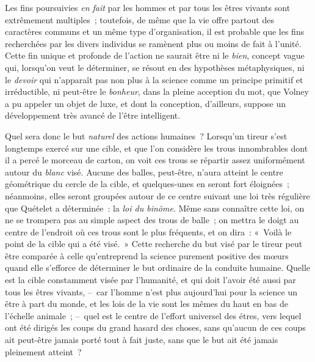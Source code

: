 \documentclass[french,twoside]{book} %
\begin{document}
Les fins poursuivies \emph{en fait} par les hommes et par tous les êtres vivants sont extrêmement multiples ; toutefois, de même que la vie offre partout des caractères communs et un même type d’organisation, il est probable que les fins recherchées par les divers individus se ramènent plus ou moins de fait à l’unité. Cette fin unique et profonde de l’action ne saurait être ni le \emph{bien}, concept vague qui, lorsqu’on veut le déterminer, se résout en des hypothèses métaphysiques, ni le \emph{devoir} qui n’apparaît pas non plus à la science comme un principe primitif et irréductible, ni peut-être le \emph{bonheur}, dans la pleine acception du mot, que Volney a pu appeler un objet de luxe, et dont la conception, d’ailleurs, suppose un développement très avancé de l’être intelligent.\par
Quel sera donc le but \emph{naturel} des actions humaines ? Lorsqu’un tireur s’est longtemps exercé sur une cible, et que l’on considère les trous innombrables dont il a percé le morceau de carton, on voit ces trous se répartir assez uniformément autour du \emph{blanc} visé. Aucune des balles, peut-être, n’aura atteint le centre géométrique du cercle de la cible, et quelques-unes en seront fort éloignées ; néanmoins, elles seront groupées autour de ce centre suivant une loi très régulière que Quételet a déterminée : la \emph{loi du binôme}. Même sans connaître cette loi, on ne se trompera pas au simple aspect des trous de balle ; on mettra le doigt au centre de l’endroit où ces trous sont le plus fréquents, et on dira : « Voilà le point de la cible qui a été visé. » Cette recherche du but visé par le tireur peut être comparée à celle qu’entreprend la science purement positive des mœurs quand elle s’efforce de déterminer le but ordinaire de la conduite humaine. Quelle est la cible constamment visée par l’humanité, et qui doit l’avoir été aussi par tous les êtres vivants, – car l’homme n’est plus aujourd’hui pour la science un être à part du monde, et les lois de la vie sont les mêmes du haut en bas de l’échelle animale ; – quel est le centre de l’effort universel des étres, vers lequel ont été dirigés les coups du grand hasard des choses, sans qu’aucun de ces coups ait peut-être jamais porté tout à fait juste, sans que le but ait été jamais pleinement atteint ?\par
\end{document}
